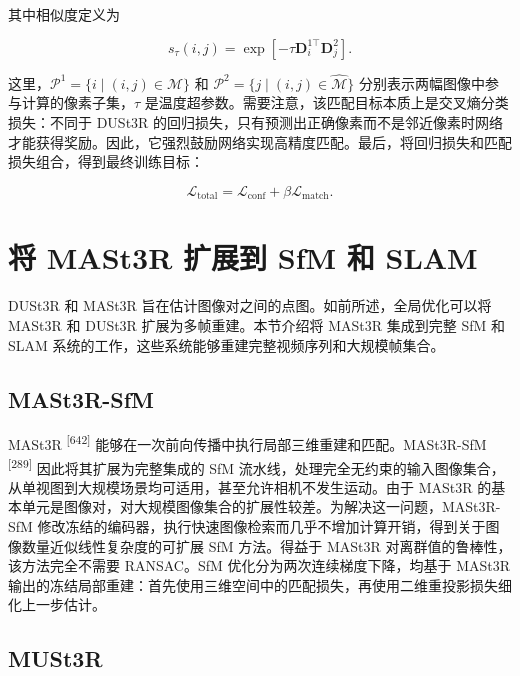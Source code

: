 其中相似度定义为

\begin{equation}
s _ {\tau} (i, j) = \exp \left[ - \tau \pmb {D} _ {i} ^ {1 \top} \pmb {D} _ {j} ^ {2} \right].\tag{13.22}
\end{equation}

这里，$\mathcal{P}^1=\{i\mid(i,j)\in\hat{\mathcal{M}}\}$ 和 $\mathcal{P}^2=\{j\mid(i,j)\in\hat{\mathcal{M}}\}$ 分别表示两幅图像中参与计算的像素子集，$\tau$ 是温度超参数。需要注意，该匹配目标本质上是交叉熵分类损失：不同于 DUSt3R 的回归损失，只有预测出正确像素而不是邻近像素时网络才能获得奖励。因此，它强烈鼓励网络实现高精度匹配。最后，将回归损失和匹配损失组合，得到最终训练目标：

\begin{equation}
\mathcal {L} _ {\mathrm{total}} = \mathcal {L} _ {\mathrm{conf}} + \beta \mathcal {L} _ {\mathrm{match}}.\tag{13.23}
\end{equation}

\section{将 MASt3R 扩展到 SfM 和 SLAM}

DUSt3R 和 MASt3R 旨在估计图像对之间的点图。如前所述，全局优化可以将 MASt3R 和 DUSt3R 扩展为多帧重建。本节介绍将 MASt3R 集成到完整 SfM 和 SLAM 系统的工作，这些系统能够重建完整视频序列和大规模帧集合。

\subsection{MASt3R-SfM}

MASt3R \textsuperscript{[642]} 能够在一次前向传播中执行局部三维重建和匹配。MASt3R-SfM \textsuperscript{[289]} 因此将其扩展为完整集成的 SfM 流水线，处理完全无约束的输入图像集合，从单视图到大规模场景均可适用，甚至允许相机不发生运动。由于 MASt3R 的基本单元是图像对，对大规模图像集合的扩展性较差。为解决这一问题，MASt3R-SfM 修改冻结的编码器，执行快速图像检索而几乎不增加计算开销，得到关于图像数量近似线性复杂度的可扩展 SfM 方法。得益于 MASt3R 对离群值的鲁棒性，该方法完全不需要 RANSAC。SfM 优化分为两次连续梯度下降，均基于 MASt3R 输出的冻结局部重建：首先使用三维空间中的匹配损失，再使用二维重投影损失细化上一步估计。

\subsection{MUSt3R}

